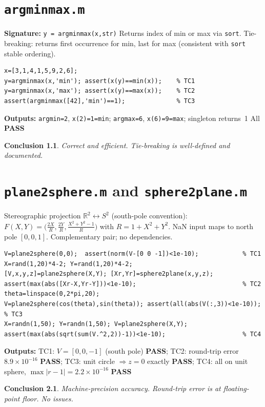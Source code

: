 \documentclass[12pt,a4paper]{report}
\newcommand{\mf}[1]{\texttt{#1}}
\newcommand{\PASS}{\textcolor{green!60!black}{\textbf{PASS}}}
\newtheorem{concl}{Conclusion}[chapter]
\begin{document}
\chapter{\mf{argminmax.m}}
\begin{tcolorbox}[Abox,title=Analysis]
\textbf{Signature:} \lstinline|y = argminmax(x,str)|\quad
Returns index of min or max via \mf{sort}. Tie-breaking: returns first occurrence for min, last for max (consistent with \mf{sort} stable ordering).
\end{tcolorbox}
\begin{lstlisting}[caption={Tests for argminmax.m}]
x=[3,1,4,1,5,9,2,6];
y=argminmax(x,'min'); assert(x(y)==min(x));    % TC1
y=argminmax(x,'max'); assert(x(y)==max(x));    % TC2
assert(argminmax([42],'min')==1);              % TC3
\end{lstlisting}
\begin{tcolorbox}[Pbox,title=TC1--TC3 -- All pass]
\textbf{Outputs:} \texttt{argmin=2}, \texttt{x(2)=1=min}; \texttt{argmax=6}, \texttt{x(6)=9=max}; singleton returns~1 \quad All \PASS
\end{tcolorbox}
\begin{concl}
Correct and efficient. Tie-breaking is well-defined and documented.
\end{concl}

\chapter{\mf{plane2sphere.m} and \mf{sphere2plane.m}}
\begin{tcolorbox}[Abox,title=Analysis]
Stereographic projection $\mathbb{R}^2\leftrightarrow S^2$ (south-pole convention):
$F(X,Y)=\bigl(\frac{2X}{R},\frac{2Y}{R},\frac{X^2+Y^2-1}{R}\bigr)$ with $R=1+X^2+Y^2$.
NaN input maps to north pole $[0,0,1]$. Complementary pair; no dependencies.
\end{tcolorbox}
\begin{lstlisting}[caption={Tests for plane2sphere.m / sphere2plane.m}]
V=plane2sphere(0,0);  assert(norm(V-[0 0 -1])<1e-10);            % TC1
X=rand(1,20)*4-2; Y=rand(1,20)*4-2;
[V,x,y,z]=plane2sphere(X,Y); [Xr,Yr]=sphere2plane(x,y,z);
assert(max(abs([Xr-X,Yr-Y]))<1e-10);                             % TC2
theta=linspace(0,2*pi,20);
V=plane2sphere(cos(theta),sin(theta)); assert(all(abs(V(:,3))<1e-10)); % TC3
X=randn(1,50); Y=randn(1,50); V=plane2sphere(X,Y);
assert(max(abs(sqrt(sum(V.^2,2))-1))<1e-10);                     % TC4
\end{lstlisting}
\begin{tcolorbox}[Pbox,title=TC1--TC4 -- All pass]
\textbf{Outputs:}
TC1: $V=[0,0,-1]$ (south pole) \PASS; TC2: round-trip error $8.9\times10^{-16}$ \PASS;
TC3: unit circle $\Rightarrow z=0$ exactly \PASS; TC4: all on unit sphere, $\max|r-1|=2.2\times10^{-16}$ \PASS
\end{tcolorbox}
\begin{concl}
Machine-precision accuracy. Round-trip error is at floating-point floor. No issues.
\end{concl}
\end{document}
